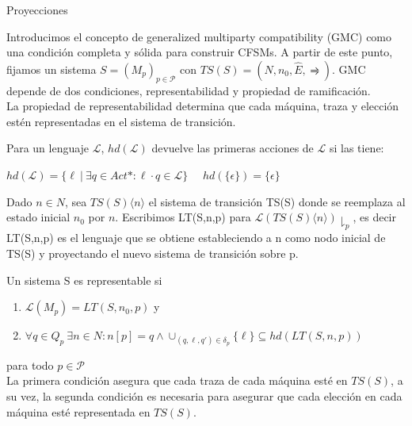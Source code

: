 \begin{example}{Proyecciones}


\end{example}

Introducimos el concepto de generalized multiparty compatibility (GMC) como una condición completa y sólida para construir CFSMs. 
A partir de este punto, fijamos un sistema $S =(M_p)_{p \in \mathcal{P}} $ con $TS(S)= (N, n_0, \hat{E}, \rightrightharpoons)$. GMC depende de dos condiciones, representabilidad y propiedad de ramificación.\\

La propiedad de representabilidad determina que cada máquina, traza y elección estén representadas en el sistema de transición.

\begin{definition}Para un lenguaje $\mathcal{L}$, $hd(\mathcal{L})$ devuelve las primeras acciones de $\mathcal{L}$ si las tiene: 
\begin{center}
$hd(\mathcal{L})= \{\ell \ | \ \exists q \in Act*: \ell \cdot q \in \mathcal{L} \}$	\ \	 $hd(\{ \epsilon \}) = \{ \epsilon \}$
\end{center}
Dado $n \in N$, sea $ TS(S)\langle n \rangle$ el sistema de transición TS(S) donde se reemplaza al estado inicial $n_0$ por $n$. Escribimos LT(S,n,p) para $\mathcal{L}(TS(S)\langle n \rangle)\downharpoonright_p $, es decir LT(S,n,p) es el lenguaje que se obtiene estableciendo a n como nodo inicial de TS(S) y proyectando el nuevo sistema de transición sobre p.
\end{definition}

\begin{definition}[Representabilidad]Un sistema S es representable si
\begin{enumerate}
\item $\mathcal{L}(M_p) = LT(S,n_0,p) $ y
\item $\forall q \in Q_p \ \exists n \in N: n[p] = q \land  \cup_{(q,\ell, q') \in \delta_p} \{ \ell \} \subseteq hd (LT(S,n,p))$
\end{enumerate}
para todo $p \in \mathcal{P} $ \\

La primera condición asegura que cada traza de cada máquina esté en $TS(S)$, a su vez, la segunda condición es necesaria para asegurar que cada elección en cada máquina esté representada en $TS(S)$.
\end{definition}

